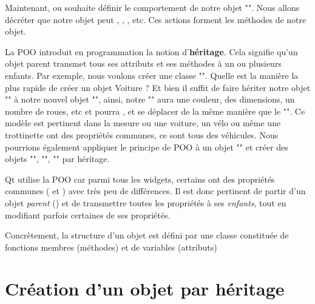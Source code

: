 Maintenant, ou souhaite définir le comportement de notre objet "". Nous allons décréter que notre objet peut , , , etc.
Ces actions forment les méthodes de notre objet.\newline \newline



La POO introduit en programmation la notion d'\textbf{héritage}. \newline
Cela signifie qu'un objet parent transmet tous ses attributs et ses méthodes à un ou plusieurs enfants. \newline
Par exemple, nous voulons créer une classe "". Quelle est la manière la plus rapide de créer un objet Voiture ? Et bien il suffit de faire hériter notre objet "" à notre nouvel objet "", ainsi, notre "" aura une couleur, des dimensions, un nombre de roues, etc et pourra ,  et se déplacer de la même manière que le "". \newline Ce modèle est pertinent dans la mesure ou une voiture, un vélo ou même une trottinette ont des propriétés communes, ce sont tous des véhicules. \newline
Nous pourrions également appliquer le principe de POO à un objet "" et créer des objets "", "", "" par héritage. \newline




Qt utilise la POO car parmi tous les widgets, certains ont des propriétés communes ( et ) avec très peu de différences. Il est donc pertinent de partir d'un objet \textit{parent} () et de transmettre toutes les propriétés à ses \textit{enfants}, tout en modifiant parfois certaines de ses propriétés. \newline

Concrètement, la structure d'un objet est défini par une classe constituée de fonctions membres (méthodes) et de variables (attributs)

\section{Création d'un objet par héritage}

